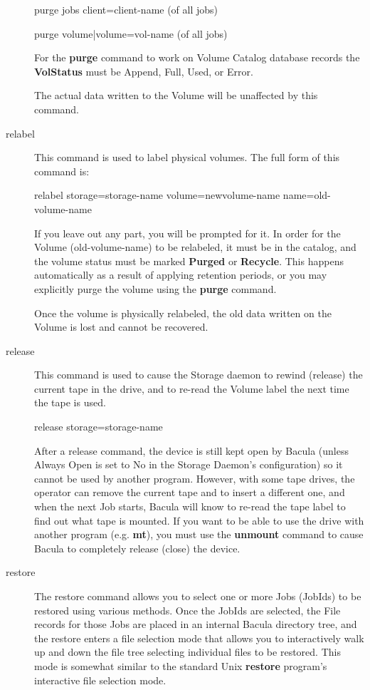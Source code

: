 \begin{description}
purge jobs client=\lt{}client-name\gt{} (of all jobs)

purge volume|volume=\lt{}vol-name\gt{} (of all jobs)

For the {\bf purge} command to work on Volume Catalog database  records the
{\bf VolStatus}  must be Append, Full, Used, or Error.  

The actual data written to the Volume will be unaffected by  this command.  

\item [relabel]
   This command is used to label physical volumes.  The full form of this command
is:

relabel storage=\lt{}storage-name\gt{} volume=\lt{}newvolume-name\gt{} 
name=\lt{}old-volume-name\gt{}  

If you leave out any part, you will be prompted for it.  In order for the
Volume (old-volume-name) to be relabeled,  it must be in the catalog, and the
volume status must  be marked {\bf Purged} or {\bf Recycle}. This happens
automatically as a  result of applying retention periods, or you may
explicitly  purge the volume using the {\bf purge} command.  

Once the volume is physically relabeled, the old data written on  the Volume
is lost and cannot be recovered.  

\item [release]
   This command is used to cause the Storage  daemon to rewind (release) the
current tape in the drive, and  to re-read the Volume label the next time the
tape is used.  

release storage=\lt{}storage-name\gt{}  

After a release command, the device is still kept open  by Bacula (unless
Always Open is set to No in the Storage  Daemon's configuration) so it cannot
be used by another program.  However, with some tape drives,  the operator can
remove the current tape and to insert a  different one, and when the next Job
starts, Bacula will  know to re-read the tape label to find out what tape is 
mounted. If you want to be able to use the drive with  another program (e.g.
{\bf mt}), you must use the {\bf unmount}  command to cause Bacula to
completely release (close) the device.  

\item [restore]
   The restore command allows you to select one  or more Jobs (JobIds) to be
restored using various methods.  Once the JobIds are selected, the File
records  for those Jobs are placed in an internal Bacula directory  tree, and
the restore enters a file selection mode that allows  you to interactively
walk up and down the file tree selecting  individual files to be restored.
This mode is somewhat similar to  the standard Unix {\bf restore} program's
interactive file  selection mode.  


\end{description}
